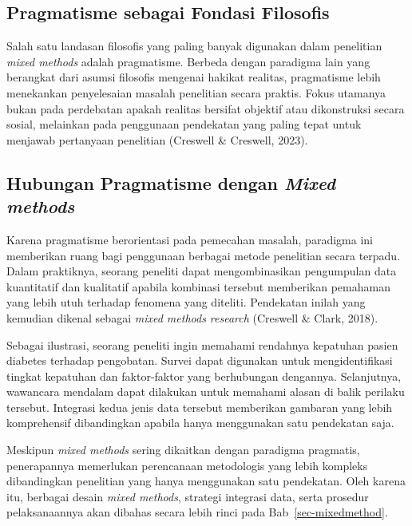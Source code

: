 \documentclass[
  indonesian,
  letterpaper,
  DIV=11,
  numbers=noendperiod]{scrreprt}
\begin{document}
\subsection{Pragmatisme sebagai Fondasi
Filosofis}\label{pragmatisme-sebagai-fondasi-filosofis}

Salah satu landasan filosofis yang paling banyak digunakan dalam
penelitian \emph{mixed methods} adalah pragmatisme. Berbeda dengan
paradigma lain yang berangkat dari asumsi filosofis mengenai hakikat
realitas, pragmatisme lebih menekankan penyelesaian masalah penelitian
secara praktis. Fokus utamanya bukan pada perdebatan apakah realitas
bersifat objektif atau dikonstruksi secara sosial, melainkan pada
penggunaan pendekatan yang paling tepat untuk menjawab pertanyaan
penelitian (Creswell \& Creswell, 2023).

\subsection{\texorpdfstring{Hubungan Pragmatisme dengan \emph{Mixed
methods}}{Hubungan Pragmatisme dengan Mixed methods}}\label{hubungan-pragmatisme-dengan-mixed-methods}

Karena pragmatisme berorientasi pada pemecahan masalah, paradigma ini
memberikan ruang bagi penggunaan berbagai metode penelitian secara
terpadu. Dalam praktiknya, seorang peneliti dapat mengombinasikan
pengumpulan data kuantitatif dan kualitatif apabila kombinasi tersebut
memberikan pemahaman yang lebih utuh terhadap fenomena yang diteliti.
Pendekatan inilah yang kemudian dikenal sebagai \emph{mixed methods
research} (Creswell \& Clark, 2018).

Sebagai ilustrasi, seorang peneliti ingin memahami rendahnya kepatuhan
pasien diabetes terhadap pengobatan. Survei dapat digunakan untuk
mengidentifikasi tingkat kepatuhan dan faktor-faktor yang berhubungan
dengannya. Selanjutnya, wawancara mendalam dapat dilakukan untuk
memahami alasan di balik perilaku tersebut. Integrasi kedua jenis data
tersebut memberikan gambaran yang lebih komprehensif dibandingkan
apabila hanya menggunakan satu pendekatan saja.

Meskipun \emph{mixed methods} sering dikaitkan dengan paradigma
pragmatis, penerapannya memerlukan perencanaan metodologis yang lebih
kompleks dibandingkan penelitian yang hanya menggunakan satu pendekatan.
Oleh karena itu, berbagai desain \emph{mixed methods}, strategi
integrasi data, serta prosedur pelaksanaannya akan dibahas secara lebih
rinci pada Bab~\ref{sec-mixedmethod}.
\end{document}
